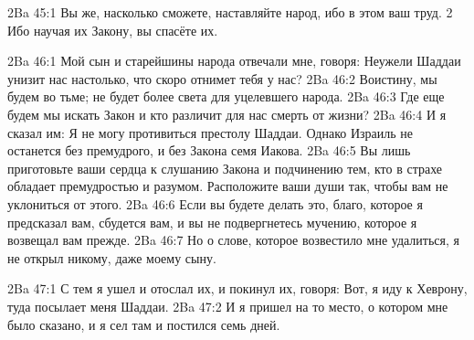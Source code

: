 \vs 2Ba 45:1
Вы же, насколько сможете, наставляйте народ, ибо в этом ваш труд. 2 Ибо научая их Закону, вы спасёте их.

\vs 2Ba 46:1
Мой сын и старейшины народа отвечали мне, говоря: Неужели Шаддаи унизит нас настолько, что скоро отнимет тебя у нас?
\vs 2Ba 46:2
Воистину, мы будем во тьме; не будет более света для уцелевшего народа.
\vs 2Ba 46:3
Где еще будем мы искать Закон и кто различит для нас смерть от жизни?
\vs 2Ba 46:4
И я сказал им: Я не могу противиться престолу Шаддаи. Однако Израиль не останется без премудрого, и без Закона семя Иакова.
\vs 2Ba 46:5
Вы лишь приготовьте ваши сердца к слушанию Закона и подчинению тем, кто в страхе обладает премудростью и разумом. Расположите ваши души так, чтобы вам не уклониться от этого.
\vs 2Ba 46:6
Если вы будете делать это, благо, которое я предсказал вам, сбудется вам, и вы не подвергнетесь мучению, которое я возвещал вам прежде.
\vs 2Ba 46:7
Но о слове, которое возвестило мне удалиться, я не открыл никому, даже моему сыну.

\vs 2Ba 47:1
С тем я ушел и отослал их, и покинул их, говоря: Вот, я иду к Хеврону, туда посылает меня Шаддаи.
\vs 2Ba 47:2
И я пришел на то место, о котором мне было сказано, и я сел там и постился семь дней.

